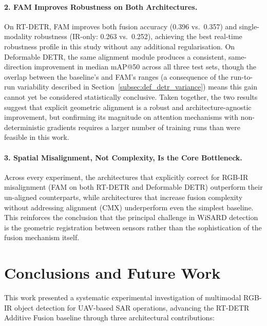 \documentclass[12pt, a4paper]{article}
\begin{document}
\paragraph{2. FAM Improves Robustness on Both Architectures.}
On RT-DETR, FAM improves both fusion accuracy (0.396 vs.\ 0.357) and single-modality robustness (IR-only: 0.263 vs.\ 0.252), achieving the best real-time robustness profile in this study without any additional regularisation. On Deformable DETR, the same alignment module produces a consistent, same-direction improvement in median mAP@50 across all three test sets, though the overlap between the baseline's and FAM's ranges (a consequence of the run-to-run variability described in Section~\ref{subsec:def_detr_variance}) means this gain cannot yet be considered statistically conclusive. Taken together, the two results suggest that explicit geometric alignment is a robust and architecture-agnostic improvement, but confirming its magnitude on attention mechanisms with non-deterministic gradients requires a larger number of training runs than were feasible in this work.

\paragraph{3. Spatial Misalignment, Not Complexity, Is the Core Bottleneck.}
Across every experiment, the architectures that explicitly correct for RGB-IR misalignment (FAM on both RT-DETR and Deformable DETR) outperform their un-aligned counterparts, while architectures that increase fusion complexity without addressing alignment (CMX) underperform even the simplest baseline. This reinforces the conclusion that the principal challenge in WiSARD detection is the geometric registration between sensors rather than the sophistication of the fusion mechanism itself.

\newpage

\section{Conclusions and Future Work}
\label{sec:conclusions}

This work presented a systematic experimental investigation of multimodal RGB-IR object detection for UAV-based SAR operations, advancing the RT-DETR Additive Fusion baseline through three architectural contributions:
\end{document}
